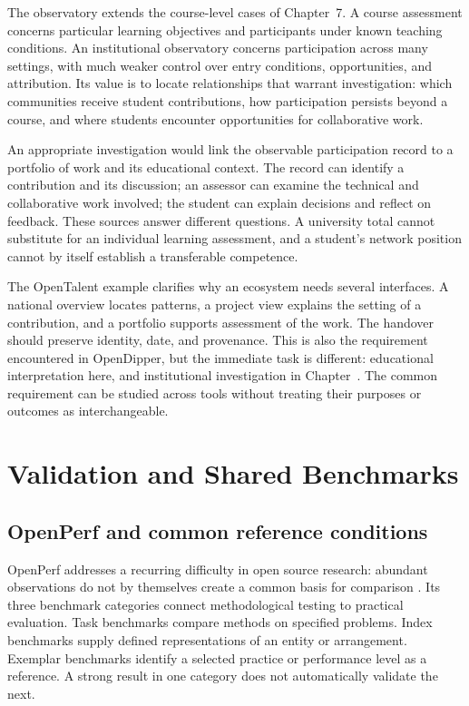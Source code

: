 The observatory extends the course-level cases of Chapter~7. A course assessment concerns particular learning objectives and participants under known teaching conditions. An institutional observatory concerns participation across many settings, with much weaker control over entry conditions, opportunities, and attribution. Its value is to locate relationships that warrant investigation: which communities receive student contributions, how participation persists beyond a course, and where students encounter opportunities for collaborative work.

An appropriate investigation would link the observable participation record to a portfolio of work and its educational context. The record can identify a contribution and its discussion; an assessor can examine the technical and collaborative work involved; the student can explain decisions and reflect on feedback. These sources answer different questions. A university total cannot substitute for an individual learning assessment, and a student's network position cannot by itself establish a transferable competence.

The OpenTalent example clarifies why an ecosystem needs several interfaces. A national overview locates patterns, a project view explains the setting of a contribution, and a portfolio supports assessment of the work. The handover should preserve identity, date, and provenance. This is also the requirement encountered in OpenDipper, but the immediate task is different: educational interpretation here, and institutional investigation in Chapter~. The common requirement can be studied across tools without treating their purposes or outcomes as interchangeable.

\FloatBarrier
\section{Validation and Shared Benchmarks}
\label{sec:ch11-benchmarks}

\subsection{OpenPerf and common reference conditions}
OpenPerf addresses a recurring difficulty in open source research: abundant observations do not by themselves create a common basis for comparison \citep{han2025openperf}. Its three benchmark categories connect methodological testing to practical evaluation. Task benchmarks compare methods on specified problems. Index benchmarks supply defined representations of an entity or arrangement. Exemplar benchmarks identify a selected practice or performance level as a reference. A strong result in one category does not automatically validate the next.


